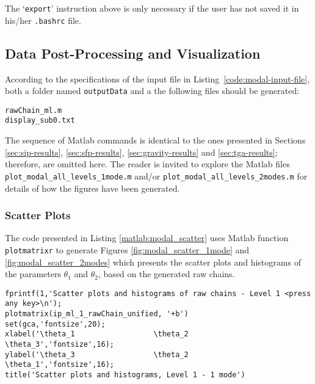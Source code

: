 The `\verb+export+' instruction above is only necessary if the user has not saved it in his/her \verb+.bashrc+ file. 


\subsection{Data Post-Processing and Visualization}\label{sec:modal-results}



According to the specifications of the input file in Listing~\ref{code:modal-input-file}, both a folder named \verb+outputData+ and a the following files should be generated:
\begin{verbatim}
rawChain_ml.m 
display_sub0.txt    
\end{verbatim}


The sequence of Matlab commands is identical to the ones presented in Sections
\ref{sec:sip-results}, \ref{sec:sfp-results}, \ref{sec:gravity-results} and \ref{sec:tga-results};
therefore, are omitted here. The reader is invited to explore the Matlab files
\texttt{plot\_modal\_all\_levels\_1mode.m}  and/or \texttt{plot\_modal\_all\_levels\_2modes.m}  
for details of how the figures have been generated.


\subsubsection{Scatter Plots}

The code presented in Listing \ref{matlab:modal_scatter} uses Matlab function \verb+plotmatrixr+ to generate Figures \ref{fig:modal_scatter_1mode} and \ref{fig:modal_scatter_2modes}
which presents the scatter plots and histograms of the parameters $\theta_1$ and $\theta_2$, based on the generated raw chains. 


\begin{lstlisting}[label=matlab:modal_scatter,caption={Matlab code for the scatter plots depicted in Figures \ref{fig:modal_scatter_1mode} and \ref{fig:modal_scatter_2modes}.}]
fprintf(1,'Scatter plots and histograms of raw chains - Level 1 <press any key>\n');
plotmatrix(ip_ml_1_rawChain_unified, '+b')
set(gca,'fontsize',20); 
xlabel('\theta_1                  \theta_2                   \theta_3','fontsize',16);
ylabel('\theta_3                  \theta_2                   \theta_1','fontsize',16);
title('Scatter plots and histograms, Level 1 - 1 mode')
\end{lstlisting}

